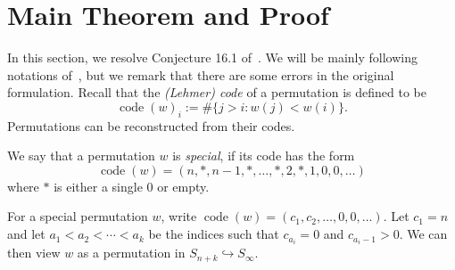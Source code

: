 \documentclass[10pt]{amsart}
\DeclareMathOperator{\code}{code}
\begin{document}
\section{Main Theorem and Proof}\label{sec:main}
In this section, we resolve Conjecture 16.1 of~\cite{postnikov2009chains}. We will be mainly following notations of~\cite{postnikov2009chains}, but we remark that there are some errors in the original formulation. Recall that the \emph{(Lehmer) code} of a permutation is defined to be
\[
\code(w)_i:=\#\{j>i:w(j)<w(i)\}.
\]
Permutations can be reconstructed from their codes.
\begin{defi}
We say that a permutation $w$ is \emph{special}, if its code has the form
\[
\code(w)=(n,*,n-1,*,\ldots,*,2,*,1,0,0,\ldots)
\]
where $*$ is either a single 0 or empty.
\end{defi}
For a special permutation $w$, write $\code(w)=(c_1,c_2,\ldots,0,0,\ldots)$. Let $c_1=n$ and let $a_1<a_2<\cdots<a_k$ be the indices such that $c_{a_i}=0$ and $c_{a_i-1}>0$. We can then view $w$ as a permutation in $S_{n+k}\hookrightarrow S_{\infty}$. 
\end{document}
